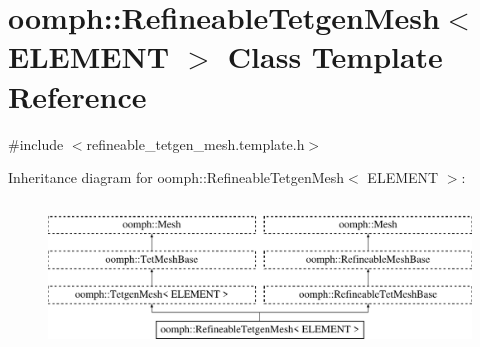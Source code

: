 \hypertarget{classoomph_1_1RefineableTetgenMesh}{}\section{oomph\+:\+:Refineable\+Tetgen\+Mesh$<$ E\+L\+E\+M\+E\+NT $>$ Class Template Reference}
\label{classoomph_1_1RefineableTetgenMesh}


{\ttfamily \#include $<$refineable\+\_\+tetgen\+\_\+mesh.\+template.\+h$>$}

Inheritance diagram for oomph\+:\+:Refineable\+Tetgen\+Mesh$<$ E\+L\+E\+M\+E\+NT $>$\+:\begin{figure}[H]
\begin{center}
\leavevmode
\includegraphics[height=4.000000cm]{classoomph_1_1RefineableTetgenMesh}
\end{center}
\end{figure}
